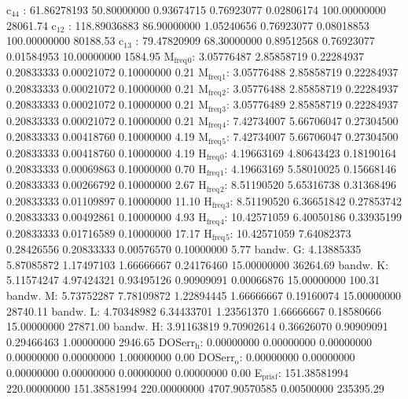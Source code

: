 \documentclass[11pt]{article}
\begin{document}
c\(_{\text{44}}\)    :  61.86278193  50.80000000   0.93674715   0.76923077   0.02806174 100.00000000     28061.74
c\(_{\text{12}}\)    : 118.89036883  86.90000000   1.05240656   0.76923077   0.08018853 100.00000000     80188.53
c\(_{\text{13}}\)    :  79.47820909  68.30000000   0.89512568   0.76923077   0.01584953  10.00000000      1584.95
M\(_{\text{freq}}\)\(_{\text{0}}\):   3.05776487   2.85858719   0.22284937   0.20833333   0.00021072   0.10000000         0.21
M\(_{\text{freq}}\)\(_{\text{1}}\):   3.05776488   2.85858719   0.22284937   0.20833333   0.00021072   0.10000000         0.21
M\(_{\text{freq}}\)\(_{\text{2}}\):   3.05776488   2.85858719   0.22284937   0.20833333   0.00021072   0.10000000         0.21
M\(_{\text{freq}}\)\(_{\text{3}}\):   3.05776489   2.85858719   0.22284937   0.20833333   0.00021072   0.10000000         0.21
M\(_{\text{freq}}\)\(_{\text{4}}\):   7.42734007   5.66706047   0.27304500   0.20833333   0.00418760   0.10000000         4.19
M\(_{\text{freq}}\)\(_{\text{5}}\):   7.42734007   5.66706047   0.27304500   0.20833333   0.00418760   0.10000000         4.19
H\(_{\text{freq}}\)\(_{\text{0}}\):   4.19663169   4.80643423   0.18190164   0.20833333   0.00069863   0.10000000         0.70
H\(_{\text{freq}}\)\(_{\text{1}}\):   4.19663169   5.58010025   0.15668146   0.20833333   0.00266792   0.10000000         2.67
H\(_{\text{freq}}\)\(_{\text{2}}\):   8.51190520   5.65316738   0.31368496   0.20833333   0.01109897   0.10000000        11.10
H\(_{\text{freq}}\)\(_{\text{3}}\):   8.51190520   6.36651842   0.27853742   0.20833333   0.00492861   0.10000000         4.93
H\(_{\text{freq}}\)\(_{\text{4}}\):  10.42571059   6.40050186   0.33935199   0.20833333   0.01716589   0.10000000        17.17
H\(_{\text{freq}}\)\(_{\text{5}}\):  10.42571059   7.64082373   0.28426556   0.20833333   0.00576570   0.10000000         5.77
bandw. G:   4.13885335   5.87085872   1.17497103   1.66666667   0.24176460  15.00000000     36264.69
bandw. K:   5.11574247   4.97424321   0.93495126   0.90909091   0.00066876  15.00000000       100.31
bandw. M:   5.73752287   7.78109872   1.22894445   1.66666667   0.19160074  15.00000000     28740.11
bandw. L:   4.70348982   6.34433701   1.23561370   1.66666667   0.18580666  15.00000000     27871.00
bandw. H:   3.91163819   9.70902614   0.36626070   0.90909091   0.29466463   1.00000000      2946.65
DOSerr\(_{\text{h}}\):   0.00000000   0.00000000   0.00000000   0.00000000   0.00000000   1.00000000         0.00
DOSerr\(_{\text{o}}\):   0.00000000   0.00000000   0.00000000   0.00000000   0.00000000   0.00000000         0.00
E\(_{\text{pris}}\)\(_{\text{f}}\): 151.38581994 220.00000000 151.38581994 220.00000000 4707.90570585   0.00500000    235395.29
\end{document}
